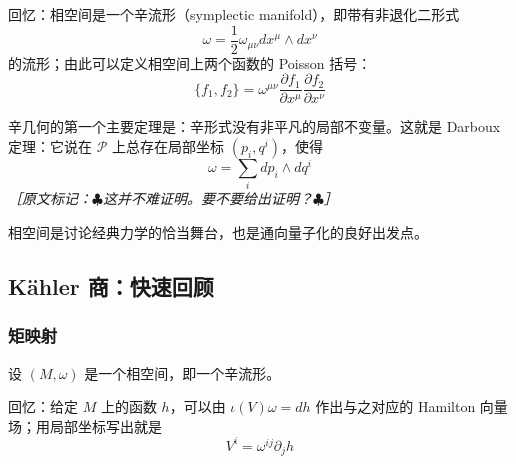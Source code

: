 回忆：相空间是一个辛流形（symplectic manifold），即带有非退化二形式
\begin{equation}
  \omega=\frac{1}{2}\omega_{\mu\nu}dx^{\mu}\wedge dx^{\nu}
  \tag{A.1}
  \label{eq:A.1}
\end{equation}
的流形；由此可以定义相空间上两个函数的 Poisson 括号：
\begin{equation}
  \{f_1,f_2\}=\omega^{\mu\nu}\frac{\partial f_1}{\partial x^{\mu}}\frac{\partial f_2}{\partial x^{\nu}}
  \tag{A.2}
  \label{eq:A.2}
\end{equation}

辛几何的第一个主要定理是：辛形式没有非平凡的局部不变量。这就是 Darboux 定理：它说在 $\mathcal{P}$ 上总存在局部坐标 $(p_i,q^i)$，使得
\begin{equation}
  \omega=\sum_i dp_i\wedge dq^i
  \tag{A.3}
  \label{eq:A.3}
\end{equation}
{\small\itshape ［原文标记：$\clubsuit$这并不难证明。要不要给出证明？$\clubsuit$］}

相空间是讨论经典力学的恰当舞台，也是通向量子化的良好出发点。

\subsection{Kähler 商：快速回顾} %

\subsubsection{矩映射} %

设 $(M,\omega)$ 是一个相空间，即一个辛流形。

回忆：给定 $M$ 上的函数 $h$，可以由 $\iota(V)\omega=dh$ 作出与之对应的 Hamilton 向量场；用局部坐标写出就是
\begin{equation}
  V^i=\omega^{ij}\partial_j h
  \tag{A.4}
  \label{eq:A.4}
\end{equation}

